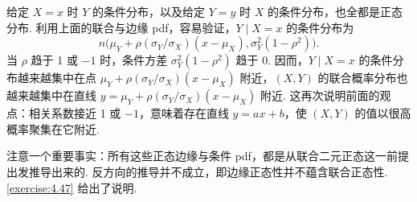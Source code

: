 给定 $X=x$ 时 $Y$ 的条件分布，以及给定 $Y=y$ 时 $X$ 的条件分布，也全都是正态分布. 利用上面的联合与边缘 pdf，容易验证，$Y\mid X=x$ 的条件分布为
$$n\bigl(\mu_Y+\rho(\sigma_Y/\sigma_X)(x-\mu_X),\sigma_Y^2(1-\rho^2)\bigr).$$
当 $\rho$ 趋于 1 或 $-1$ 时，条件方差 $\sigma_Y^2(1-\rho^2)$ 趋于 0. 因而，$Y\mid X=x$ 的条件分布越来越集中在点 $\mu_Y+\rho(\sigma_Y/\sigma_X)(x-\mu_X)$ 附近，$(X,Y)$ 的联合概率分布也越来越集中在直线 $y=\mu_Y+\rho(\sigma_Y/\sigma_X)(x-\mu_X)$ 附近. 这再次说明前面的观点：相关系数接近 1 或 $-1$，意味着存在直线 $y=ax+b$，使 $(X,Y)$ 的值以很高概率聚集在它附近.

注意一个重要事实：所有这些正态边缘与条件 pdf，都是从联合二元正态这一前提出发推导出来的. 反方向的推导并不成立，即边缘正态性并不蕴含联合正态性. \autoref{exercise:4.47} 给出了说明.
